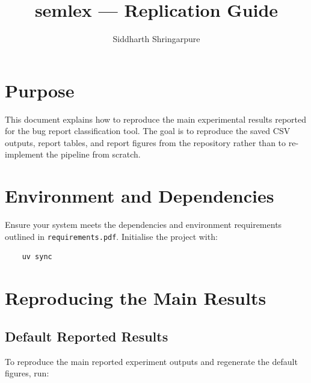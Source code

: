 \documentclass[10pt,a4paper]{article}
\title{semlex --- Replication Guide}
\author{Siddharth Shringarpure}
\date{}
\begin{document}
\singlespacing
\pagestyle{plain}
\maketitle

\section{Purpose}

This document explains how to reproduce the main experimental results reported for the bug report classification tool. The goal is to reproduce the saved CSV outputs, report tables, and report figures from the repository rather than to re-implement the pipeline from scratch.


\section{Environment and Dependencies}

Ensure your system meets the dependencies and environment requirements outlined in \texttt{requirements.pdf}. Initialise the project with:

\begin{verbatim}
    uv sync
\end{verbatim}


\section{Reproducing the Main Results}

\subsection{Default Reported Results}

To reproduce the main reported experiment outputs and regenerate the default
figures, run:
\end{document}
